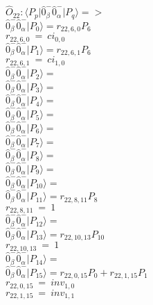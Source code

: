 \documentclass[14pt]{article}
\begin{document}
    $\hat{O}_{22}:  \langle{P_p}\vert \hat{0}_{\beta}^{-}\hat{0}_{\alpha}^{-} \vert{P_q}\rangle => $ \\ 
    $ \hat{0}_{\beta}^{-}\hat{0}_{\alpha}^{-} \vert{P_{0}}\rangle = {r}_{22,6,0}P_{6} $ \\ 
    ${r}_{22,6,0}\ =\ {ci}_{0,0} $ \\ 
    $ \hat{0}_{\beta}^{-}\hat{0}_{\alpha}^{-} \vert{P_{1}}\rangle = {r}_{22,6,1}P_{6} $ \\ 
    ${r}_{22,6,1}\ =\ {ci}_{1,0} $ \\ 
    $ \hat{0}_{\beta}^{-}\hat{0}_{\alpha}^{-} \vert{P_{2}}\rangle =  $ \\ 
    $ \hat{0}_{\beta}^{-}\hat{0}_{\alpha}^{-} \vert{P_{3}}\rangle =  $ \\ 
    $ \hat{0}_{\beta}^{-}\hat{0}_{\alpha}^{-} \vert{P_{4}}\rangle =  $ \\ 
    $ \hat{0}_{\beta}^{-}\hat{0}_{\alpha}^{-} \vert{P_{5}}\rangle =  $ \\ 
    $ \hat{0}_{\beta}^{-}\hat{0}_{\alpha}^{-} \vert{P_{6}}\rangle =  $ \\ 
    $ \hat{0}_{\beta}^{-}\hat{0}_{\alpha}^{-} \vert{P_{7}}\rangle =  $ \\ 
    $ \hat{0}_{\beta}^{-}\hat{0}_{\alpha}^{-} \vert{P_{8}}\rangle =  $ \\ 
    $ \hat{0}_{\beta}^{-}\hat{0}_{\alpha}^{-} \vert{P_{9}}\rangle =  $ \\ 
    $ \hat{0}_{\beta}^{-}\hat{0}_{\alpha}^{-} \vert{P_{10}}\rangle =  $ \\ 
    $ \hat{0}_{\beta}^{-}\hat{0}_{\alpha}^{-} \vert{P_{11}}\rangle = {r}_{22,8,11}P_{8} $ \\ 
    ${r}_{22,8,11}\ =\ 1 $ \\ 
    $ \hat{0}_{\beta}^{-}\hat{0}_{\alpha}^{-} \vert{P_{12}}\rangle =  $ \\ 
    $ \hat{0}_{\beta}^{-}\hat{0}_{\alpha}^{-} \vert{P_{13}}\rangle = {r}_{22,10,13}P_{10} $ \\ 
    ${r}_{22,10,13}\ =\ 1 $ \\ 
    $ \hat{0}_{\beta}^{-}\hat{0}_{\alpha}^{-} \vert{P_{14}}\rangle =  $ \\ 
    $ \hat{0}_{\beta}^{-}\hat{0}_{\alpha}^{-} \vert{P_{15}}\rangle = {r}_{22,0,15}P_{0}+{r}_{22,1,15}P_{1} $ \\ 
    ${r}_{22,0,15}\ =\ {inv}_{1,0} $ \\ 
    ${r}_{22,1,15}\ =\ {inv}_{1,1} $ \\ 
    
\end{document}
